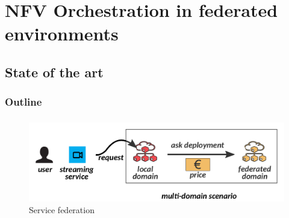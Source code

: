 \documentclass[aspectratio=169]{beamer}
\begin{document}
\section{NFV Orchestration in federated environments}
\subsection{State of the art}
\begin{frame}
    \frametitle{Outline}
    \tableofcontents[subsectionstyle=show/shaded/hide,sectionstyle=show/shaded]
\end{frame}





\begin{frame}
    \frametitle{\secname}
    \framesubtitle{\subsecname}

    \begin{figure}
        \centering
        \includegraphics[width=\textwidth]{img/federation.pdf}
        \caption{Service federation}
        \label{fig:federation}
    \end{figure}

\end{frame}
\end{document}
